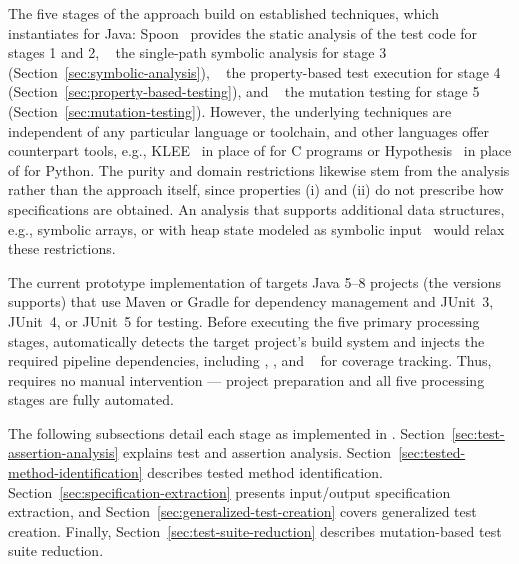 The five stages of the approach build on established techniques,
which \ToolTeralizer{} instantiates for Java:
Spoon~\cite{pawlak_2016_spoon} provides the static analysis of the test code for stages 1 and 2,
\ToolSPF{}~\cite{pasareanu_2013_symbolic} the single-path symbolic analysis for stage 3
(Section~\ref{sec:symbolic-analysis}),
\ToolJqwik{}~\cite{link_2022_jqwik} the property-based test execution for stage 4
(Section~\ref{sec:property-based-testing}),
and \ToolPit{}~\cite{coles_2016_pit} the mutation testing for stage 5
(Section~\ref{sec:mutation-testing}).
However, the underlying techniques are independent of any particular language or toolchain,
and other languages offer counterpart tools,
e.g., KLEE~\cite{cadar_2008_klee} in place of \ToolSPF{} for C programs
or Hypothesis~\cite{maciver_2019_hypothesis} in place of \ToolJqwik{} for Python.
The purity and domain restrictions likewise stem from the analysis
rather than the approach itself,
since properties (i) and (ii) do not prescribe how specifications are obtained.
An analysis that supports additional data structures, e.g., symbolic arrays,
or with heap state modeled as symbolic input~\cite{khurshid_2003_gse}
would relax these restrictions.

The current prototype implementation of \ToolTeralizer{} targets Java 5--8 projects
(the versions \ToolSPF{} supports)
that use Maven or Gradle for dependency management
and JUnit~3, JUnit~4, or JUnit~5 for testing.
Before executing the five primary processing stages,
\ToolTeralizer{} automatically detects the target project's build system
and injects the required pipeline dependencies,
including \ToolJqwik{}, \ToolPit{}, and \ToolJacoco{}~\cite{jacoco} for coverage tracking.
Thus, \ToolTeralizer{} requires no manual intervention ---
project preparation and all five processing stages are fully automated.

The following subsections detail each stage as implemented in \ToolTeralizer{}.
Section~\ref{sec:test-assertion-analysis} explains test and assertion analysis.
Section~\ref{sec:tested-method-identification} describes tested method identification.
Section~\ref{sec:specification-extraction} presents input/output specification extraction,
and Section~\ref{sec:generalized-test-creation} covers generalized test creation.
Finally, Section~\ref{sec:test-suite-reduction} describes mutation-based test suite reduction.
